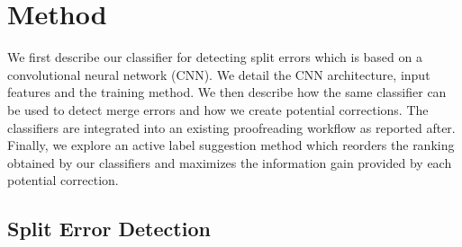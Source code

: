 

\section{Method}
\label{sec:methods}

We first describe our classifier for detecting split errors which is based on a convolutional neural network (CNN). We detail the CNN architecture, input features and the training method. We then describe how the same classifier can be used to detect merge errors and how we create potential corrections. The classifiers are integrated into an existing proofreading workflow as reported after. Finally, we explore an active label suggestion method which reorders the ranking obtained by our classifiers and maximizes the information gain provided by each potential correction.

\subsection{Split Error Detection}


